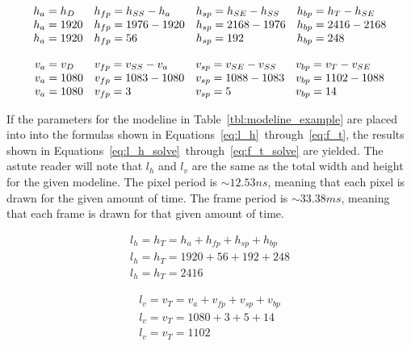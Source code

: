     \begin{equation}
        \begin{array}{ l l l l }
            h_a=h_D & h_{fp}=h_{SS}-h_a & h_{sp}=h_{SE}-h_{SS} & h_{bp}=h_T-h_{SE} \\
            h_a=1920 & h_{fp}=1976-1920 & h_{sp}=2168-1976 & h_{bp}=2416-2168 \\
            h_a=1920 & h_{fp}=56 & h_{sp}=192 & h_{bp}=248
            \label{eq:h_a_solve}
        \end{array}
    \end{equation}

    \begin{equation}
        \begin{array}{ l l l l }
            v_a=v_D & v_{fp}=v_{SS}-v_a & v_{sp}=v_{SE}-v_{SS} & v_{bp}=v_T-v_{SE} \\
            v_a=1080 & v_{fp}=1083-1080 & v_{sp}=1088-1083 & v_{bp}=1102-1088 \\
            v_a=1080 & v_{fp}=3 & v_{sp}=5 & v_{bp}=14
            \label{eq:v_a_solve}
        \end{array}
    \end{equation}

    If the parameters for the modeline in Table~\ref{tbl:modeline_example} are placed into into the formulas shown in Equations~\ref{eq:l_h}~through~\ref{eq:f_t}, the results shown in Equations~\ref{eq:l_h_solve}~through~\ref{eq:f_t_solve} are yielded. The astute reader will note that $l_h$ and $l_v$ are the same as the total width and height for the given modeline. The pixel period is $\sim12.53 ns$, meaning that each pixel is drawn for the given amount of time. The frame period is $\sim33.38 ms$, meaning that each frame is drawn for that given amount of time.

    \begin{equation}
        \begin{array}{ l }
            l_h=h_T=h_a+h_{fp}+h_{sp}+h_{bp} \\
            l_h=h_T=1920+56+192+248 \\
            l_h=h_T=2416
            \label{eq:l_h_solve}
        \end{array}
    \end{equation}

    \begin{equation}
        \begin{array}{ l }
            l_v=v_T=v_a+v_{fp}+v_{sp}+v_{bp} \\
            l_v=v_T=1080+3+5+14 \\
            l_v=v_T=1102
            \label{eq:l_v_solve}
        \end{array}
    \end{equation}

